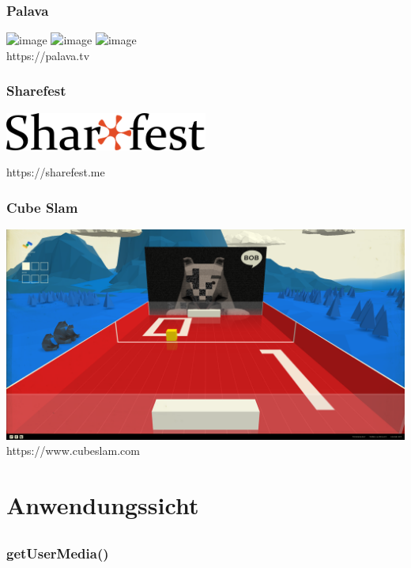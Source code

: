 \documentclass[12pt]{beamer}
\begin{document}
\begin{frame}
  \frametitle{Palava}
  \includegraphics<1>[height=0.7\textheight]{img/palava_1.jpg}
  \includegraphics<2>[height=0.7\textheight]{img/palava_2.jpg}
  \includegraphics<3>[height=0.7\textheight]{img/palava_3.jpg}
  \\ \hfill \tiny https://palava.tv
\end{frame}

\begin{frame}
  \frametitle{Sharefest}
  \centerline{\includegraphics[width=0.5\textwidth]{img/sharefest.png}}
  \centerline{\tiny https://sharefest.me}
\end{frame}

\begin{frame}
  \frametitle{Cube Slam}
  \includegraphics[height=0.7\textheight]{img/cube_slam.png} \\
  \hfill \tiny https://www.cubeslam.com
\end{frame}


\section{Anwendungssicht}
\subsection{} 

\begin{frame}
  \frametitle{getUserMedia()}
  \pause
  
\end{frame}
\end{document}
